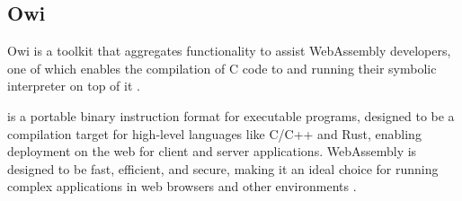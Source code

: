 
\subsection{Owi}\label{section:owi}

Owi is a toolkit that aggregates functionality to assist WebAssembly developers, one of which enables the compilation of C code to  and running their symbolic interpreter on top of it \cite{Andrès2024}.

 is a portable binary instruction format for executable programs, designed to be a compilation target for high-level languages like C/C++ and Rust, enabling deployment on the web for client and server applications. WebAssembly is designed to be fast, efficient, and secure, making it an ideal choice for running complex applications in web browsers and other environments \cite{wasm_home,wasm_use_cases}.





